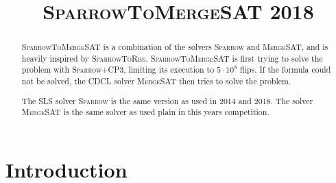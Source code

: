 \documentclass[conference]{IEEEtran}
\begin{document}
	
\title{\textsc{SparrowToMergeSAT} 2018}


\author{
\and
{}
}



\def\cp{\textsc{Coprocessor}\xspace}
\def\cpt{\textsc{CP3}\xspace}
\def\glucose{\textsc{Glucose~2.2}\xspace}
\def\minisat{\textsc{Minisat~2.2}\xspace}
\def\riss{\textsc{Riss}\xspace}
\def\mergesat{\textsc{MergeSAT}\xspace}
\def\sparrow{\textsc{Sparrow}\xspace}
\def\scp{\textsc{Sparrow+CP3}\xspace}
\def\str{\textsc{SparrowToRiss}\xspace}
\def\stm{\textsc{SparrowToMergeSAT}\xspace}

\newcommand{\nnote}[1]{$[$\textcolor{darkred}{norbert}:~~\emph{\textcolor{midgrey}{#1}}$]$}

\maketitle

\begin{abstract}
\stm is a combination of the solvers \sparrow and \mergesat, and is heavily inspired by \str.
\stm is first trying to solve the problem with \scp, limiting its execution to $5\cdot10^8$ flips.
If the formula could not be solved, the CDCL solver \mergesat then tries to solve the problem.

The SLS solver \sparrow is the same version as used in 2014 and 2018.
The solver \mergesat is the same solver as used plain in this years competition.
\end{abstract}

\section{Introduction}
\end{document}
